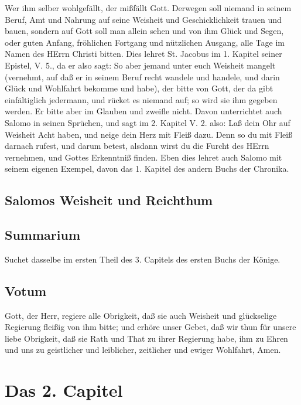 Wer ihm selber wohlgefällt, der mißfällt Gott. Derwegen soll niemand in seinem Beruf, Amt und Nahrung auf seine Weisheit und Geschicklichkeit trauen und bauen, sondern auf Gott soll man allein sehen und von ihm Glück und Segen, oder guten Anfang, fröhlichen Fortgang und nützlichen Ausgang, alle Tage im Namen des HErrn Christi bitten. Dies lehret St. Jacobus im 1. Kapitel seiner Epistel, V. 5., da er also sagt: So aber jemand unter euch Weisheit mangelt (vernehmt, auf daß er in seinem Beruf recht wandele und handele, und darin Glück und Wohlfahrt bekomme und habe), der bitte von Gott, der da gibt einfältiglich jedermann, und rücket es niemand auf; so wird sie ihm gegeben werden. Er bitte aber im Glauben und zweifle nicht. Davon unterrichtet auch Salomo in seinen Sprüchen, und sagt im 2. Kapitel V. 2. also: Laß dein Ohr auf Weisheit Acht haben, und neige dein Herz mit Fleiß dazu. Denn so du mit Fleiß darnach rufest, und darum betest, alsdann wirst du die Furcht des HErrn vernehmen, und Gottes Erkenntniß finden. Eben dies lehret auch Salomo mit seinem eigenen Exempel, davon das 1. Kapitel des andern Buchs der Chronika.

\section[Salomos Weisheit und Reichthum]{Salomos Weisheit und Reichthum}

\section{Summarium}

Suchet dasselbe im ersten Theil des 3. Capitels des ersten Buchs der Könige.

\section{Votum}

Gott, der Herr, regiere alle Obrigkeit, daß sie auch Weisheit und glückselige Regierung fleißig von ihm bitte; und erhöre unser Gebet, daß wir thun für unsere liebe Obrigkeit, daß sie Rath und That zu ihrer Regierung habe, ihm zu Ehren und uns zu geistlicher und leiblicher, zeitlicher und ewiger Wohlfahrt, Amen.

\chapter{Das 2. Capitel}

